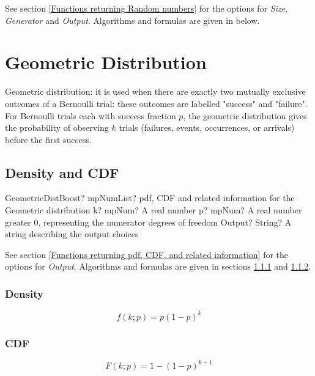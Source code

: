 \vspace{0.3cm}

See section \ref{Functions returning Random numbers} for the options for  {\itshape\sffamily Size},  {\itshape\sffamily Generator} and {\itshape\sffamily Output}. Algorithms and formulas are given in below.



\newpage
\section{Geometric Distribution}

Geometric distribution: it is used when there are exactly two mutually exclusive outcomes of a Bernoulli trial: these outcomes are labelled "success" and "failure". For Bernoulli trials each with success fraction $p$, the geometric distribution gives the probability of observing $k$ trials (failures, events,
occurrences, or arrivals) before the first success.




\subsection{Density and CDF}

\begin{mpFunctionsExtract}
	\mpFunctionThreeNotImplemented
	{GeometricDistBoost? mpNumList? pdf, CDF and related information for the Geometric distribution}
	{k? mpNum? A real number}
	{p? mpNum? A real number greater 0, representing the numerator  degrees of freedom}
	{Output? String? A string describing the output choices}
\end{mpFunctionsExtract}


\vspace{0.3cm}
See section \ref{Functions returning pdf, CDF, and related information} for the options for {\itshape\sffamily Output}. Algorithms and formulas are given in sections \ref{GeometricDistributionDensity} and \ref{GeometricDistributionCDF}.


\subsubsection{Density}
\label{GeometricDistributionDensity}

\begin{equation} 
	f(k;p)= p (1-p)^k 
\end{equation}


\subsubsection{CDF}
\label{GeometricDistributionCDF}
\begin{equation} 
	F(k;p)= 1- (1-p)^{k+1} 
\end{equation}

